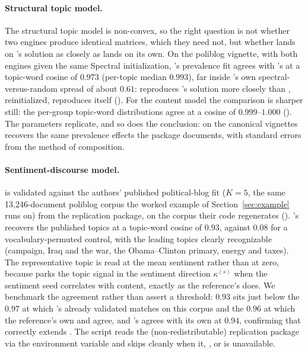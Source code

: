 \documentclass[article,nojss]{jss}
\begin{document}
\paragraph{Structural topic model.} The structural topic model is non-convex, so
the right question is not whether two engines produce identical matrices, which
they need not, but whether  lands on 's solution as closely
as  lands on its own. On the poliblog vignette, with both engines given
the same Spectral initialization, 's prevalence fit agrees with
 's at a topic-word cosine of $0.973$ (per-topic median
$0.993$), far inside 's own spectral-versus-random spread of about
$0.61$:  reproduces 's solution more closely than
, reinitialized, reproduces itself ().
For the content model the comparison is sharper still: the per-group topic-word
distributions agree at a cosine of $0.999$--$1.000$ ().
The parameters replicate, and so does the conclusion: on the canonical vignettes
 recovers the same prevalence effects the package documents, with
standard errors from the method of composition.

\paragraph{Sentiment-discourse model.}  is validated against the
authors' published political-blog fit ($K=5$, the same 13{,}246-document poliblog
corpus the worked example of Section~\ref{sec:example} runs on) from the
\citet{chen2024sts} replication package, on the corpus their  code
regenerates (). 's  recovers
the published topics at a topic-word cosine of $0.93$, against $0.08$ for a
vocabulary-permuted control, with the leading topics clearly recognizable
(campaign, Iraq and the war, the Obama--Clinton primary, energy and taxes). The
representative topic is read at the mean sentiment rather than at zero, because
 parks the topic signal in the sentiment direction $\kappa^{(s)}$ when
the sentiment seed correlates with content, exactly as the reference's
 does. We benchmark the agreement rather than assert a
threshold: $0.93$ sits just below the $0.97$ at which 's already
validated  matches   on this corpus and the $0.96$
at which the reference's own  and  agree, and 's
 agrees with its own  at $0.94$, confirming that 
correctly extends . The script reads the (non-redistributable)
replication package via the  environment variable and skips
cleanly when it, , or  is unavailable.
\end{document}

